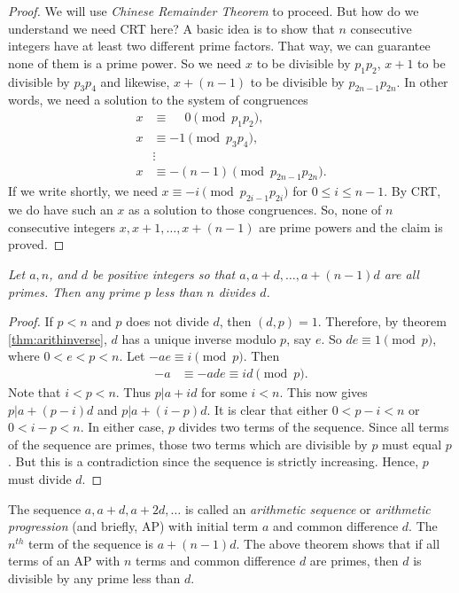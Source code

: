 \documentclass{subfiles}
\begin{document}
	\begin{proof}
		We will use \textit{Chinese Remainder Theorem} to proceed. But how do we understand we need CRT here? A basic idea is to show that $n$ consecutive integers have at least two different prime factors. That way, we can guarantee none of them is a prime power. So we need $x$ to be divisible by $p_1p_2$, $x+1$ to be divisible by $p_3p_4$ and likewise, $x+(n-1)$ to be divisible by $p_{2n-1}p_{2n}$. In other words, we need a solution to the system of congruences
		\begin{align*}
			x & \equiv \phantom{-} 0  \pmod {p_1p_2},\\
			x & \equiv -1  \pmod{p_3p_4},\\
			&  \vdots \\
			x & \equiv -(n-1) \pmod{p_{2n-1}p_{2n}}.
		\end{align*}
		If we write shortly, we need $x\equiv-i\pmod{p_{2i-1}p_{2i}}$ for $0\leq i\leq n-1$. By CRT, we do have such an $x$ as a solution to those congruences. So, none of $n$ consecutive integers $x, x+1, \ldots, x+(n-1)$ are prime powers and the claim is proved.
	\end{proof}
	
	\begin{theorem}\slshape
		Let $a,n$, and $d$ be positive integers so that $a,a+d,\ldots,a+(n-1)d$ are all primes. Then any prime $p$ less than $n$ divides $d$. 
	\end{theorem}
	
	\begin{proof}
		If $p<n$ and $p$ does not divide $d$, then $(d,p)=1$. Therefore, by theorem \eqref{thm:arithinverse}, $d$ has a unique inverse modulo $p$, say $e$. So $de\equiv1\pmod p$, where $0<e<p<n$. Let $-ae \equiv i \pmod p$. Then 
		\begin{align*}
			-a & \equiv -ade \equiv id \pmod p.
		\end{align*}
		Note that $i<p<n$. Thus $p|a+id$ for some $i<n$. This now gives $p|a+(p-i)d$ and $p|a+(i-p)d$. It is clear that either $0<p-i<n$ or $0<i-p<n$. In either case, $p$ divides two terms of the sequence. Since all terms of the sequence are primes, those two terms which are divisible by $p$ must equal $p$. But this is a contradiction since the sequence is strictly increasing. Hence, $p$ must divide $d$.
	\end{proof}
	
	\begin{remark}
		The sequence $a, a+d, a+2d, \ldots$ is called an \textit{arithmetic sequence} or \textit{arithmetic progression} (and briefly, AP) with initial term $a$ and common difference $d$. The $n^{th}$ term of the sequence is $a+(n-1)d$. The above theorem shows that if all terms of an AP with $n$ terms and common difference $d$ are primes, then $d$ is divisible by any prime less than $d$.
	\end{remark}
	
\end{document}
